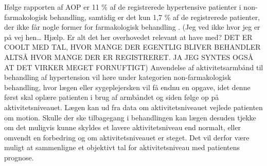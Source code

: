 Ifølge rapporten af AOP er 11 \% af de registrerede hypertensive patienter i non-farmakologisk behandling, samtidig er det kun 1,7 \% af de registrerede patienter, der ikke får nogle former for farmakologisk behandling \citep{munck2007}.
 (Jeg ved ikke hvor jeg er på vej hen… Hjælp. Er alt det her overhovedet relevant at have med? DET ER COOLT MED TAL, HVOR MANGE DER EGENTLIG BLIVER BEHANDLER ALTSÅ HVOR MANGE DER ER REGISTRERET. JA JEG SYNTES OGSÅ AT DET VIRKER MEGET FORNUFTIGT)
Anvendelse af aktivitetsarmbånd til behandling af hypertension vil høre under kategorien non-farmakologisk behandling, hvor lægen eller sygeplejersken vil få endnu en opgave, idet denne først skal oplære patienten i brug af armbåndet og siden følge op på aktivitetsniveauet. Lægen kan ud fra data om aktivitetsniveauet vejlede patienten om motion. Skulle der ske tilbagegang i behandlingen kan lægen desuden tjekke om det muligvis kunne skyldes et lavere aktivitetsniveau end normalt, eller omvendt en forbedring og om aktivitetsniveauet er steget. Det vil derfor være muligt at sammenligne et objektivt tal for aktivitetsniveau med patientens prognose. 

